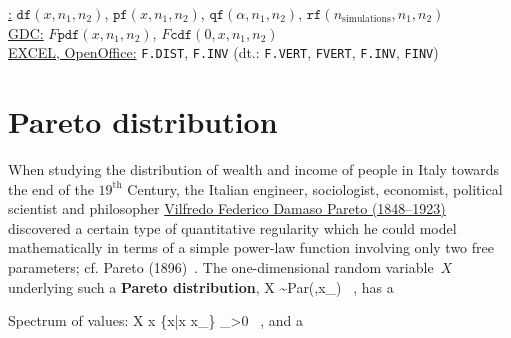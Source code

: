 \medskip
\noindent
\underline{\R:} $\texttt{df}(x,n_{1}, n_{2})$,
$\texttt{pf}(x,n_{1}, n_{2})$, $\texttt{qf}(\alpha,n_{1}, n_{2})$,
$\texttt{rf}(n_{\mathrm{simulations}},n_{1}, n_{2})$ \\
\underline{GDC:} $F\texttt{pdf}(x,n_{1},n_{2})$,
$F\texttt{cdf}(0,x,n_{1},n_{2})$ \\
\underline{EXCEL, OpenOffice:} \texttt{F.DIST}, \texttt{F.INV}
(dt.: \texttt{F.VERT}, \texttt{FVERT}, \texttt{F.INV},
\texttt{FINV})

\section[Pareto distribution]{Pareto distribution}
When studying the distribution of wealth and income of people in 
Italy towards the end of the $19^\mathrm{th}$ Century, the Italian 
engineer, sociologist, economist, political scientist and 
philosopher
\href{http://en.wikipedia.org/wiki/Vilfredo_Pareto}{Vilfredo
Federico Damaso Pareto (1848--1923)} discovered a certain type of 
quantitative regularity which he could model mathematically in 
terms of a simple power-law function involving only two free 
parameters; cf. Pareto (1896)~. The one-dimensional 
random variable~$X$ underlying such a \textbf{Pareto distribution},
%
\be
X \sim Par(\gamma,x_) \ ,
\ee
%
has a

\medskip
\noindent
Spectrum of values:
%
\be
X \mapsto x \in \{x|x \geq x_\} \subset {}_{>0}
\ ,
\ee
%
and a

